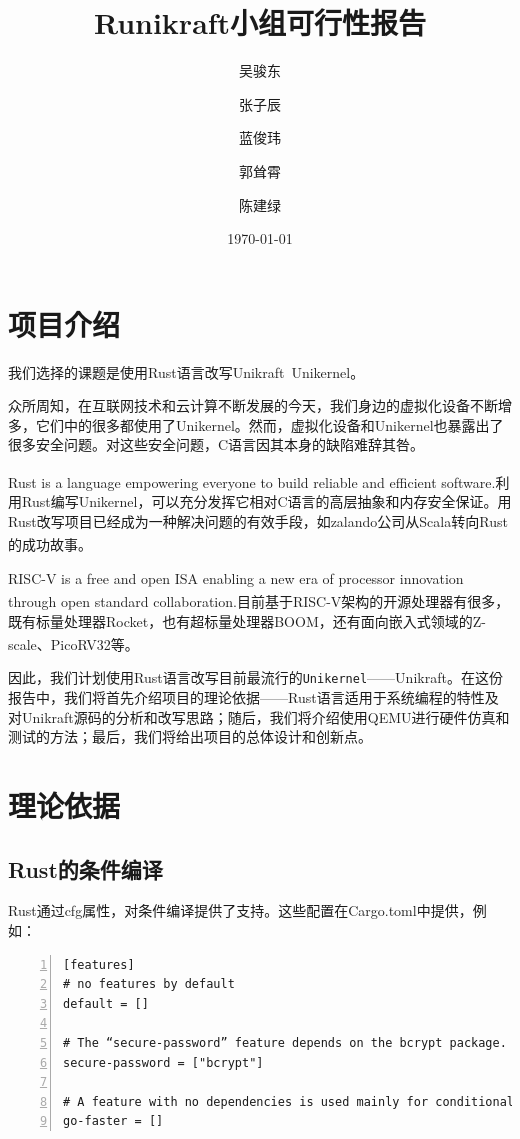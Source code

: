 \documentclass[UTF8,fontset=none,linespread=1.15]{ctexart}
\let\nosupcite\cite
\renewcommand*{\cite}[1]{\textsuperscript{\nosupcite{#1}}}
\begin{document}
\sffamily %
\title{\bfseries Runikraft小组\quad 可行性报告}
\author{吴骏东\and 张子辰\and 蓝俊玮\and 郭耸霄\and 陈建绿}
\date{\today}
\maketitle

\tableofcontents
\section{项目介绍}
我们选择的课题是使用Rust语言改写Unikraft\ Unikernel。

众所周知，在互联网技术和云计算不断发展的今天，我们身边的虚拟化设备不断增多，它们中的很多都使用了Unikernel。然而，虚拟化设备和Unikernel也暴露出了很多安全问题。对这些安全问题，C语言因其本身的缺陷难辞其咎。

Rust is a language empowering everyone to build reliable and efficient software.\cite{7}利用Rust编写Unikernel，可以充分发挥它相对C语言的高层抽象和内存安全保证。用Rust改写项目已经成为一种解决问题的有效手段，如zalando公司从Scala转向Rust的成功故事。\cite{3}

RISC-V is a free and open ISA enabling a new era of processor innovation through open standard collaboration.\cite{0}目前基于RISC-V架构的开源处理器有很多，既有标量处理器Rocket，也有超标量处理器BOOM，还有面向嵌入式领域的Z-scale、PicoRV32等。\cite{2}

因此，我们计划使用Rust语言改写目前最流行的\texttt{Unikernel}——Unikraft。在这份报告中，我们将首先介绍项目的理论依据——Rust语言适用于系统编程的特性及对Unikraft源码的分析和改写思路；随后，我们将介绍使用QEMU进行硬件仿真和测试的方法；最后，我们将给出项目的总体设计和创新点。
\section{理论依据}
\subsection{Rust的条件编译}
Rust通过cfg属性，对条件编译提供了支持。这些配置在Cargo.toml中提供，例如：

\begin{lstlisting}[numbers=left]
[features]
# no features by default
default = []

# The “secure-password” feature depends on the bcrypt package.
secure-password = ["bcrypt"]

# A feature with no dependencies is used mainly for conditional 	 compilation, like `#[cfg(feature = "go-faster")]`.
go-faster = []
\end{lstlisting}
\end{document}
